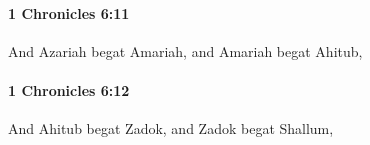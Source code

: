 		\paragraph{1 Chronicles 6:11} %
			\label{1CHRONICLES-6-11}

			And Azariah begat Amariah, and Amariah begat Ahitub,


		\paragraph{1 Chronicles 6:12} %
			\label{1CHRONICLES-6-12}

			And Ahitub begat Zadok, and Zadok begat Shallum,


